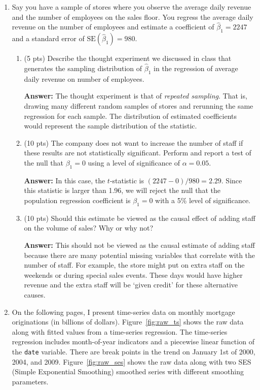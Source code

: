\documentclass[12pt]{article}
\newcommand{\answer}[1]{{\color{blue_winged_teal}\textbf{Answer:} #1}}
\newcommand{\pts}[1]{{\color{zinc500}(#1 pts)}}
\begin{document}
\begin{enumerate}
    \newpage
    \vspace*{2\bigskipamount}
  \item Say you have a sample of stores where you observe the average daily revenue and the number of employees on the sales floor.
    You regress the average daily revenue on the number of employees and estimate a coefficient of $\hat{\beta}_1 = 2247$ and a standard error of $\text{SE}(\hat{\beta}_1) = 980$.
    \begin{enumerate}
      \item \pts{5} Describe the thought experiment we discussed in class that generates the sampling distribution of $\hat{\beta}_1$ in the regression of average daily revenue on number of employees.
      
      \answer{
        The thought experiment is that of \emph{repeated sampling}.
        That is, drawing many different random samples of stores and rerunning the same regression for each sample. 
        The distribution of estimated coefficients would represent the sample distribution of the statistic.
      }

      \item \pts{10} The company does not want to increase the number of staff if these results are not statistically significant. Perform and report a test of the null that $\beta_1 = 0$ using a level of significance of $\alpha = 0.05$.
      
      \answer{
        In this case, the $t$-statistic is $(2247 - 0) / 980 = 2.29$.
        Since this statistic is larger than 1.96, we will reject the null that the population regression coefficient is $\beta_1 = 0$ with a 5\% level of significance.
      }

      \item \pts{10} Should this estimate be viewed as the causal effect of adding staff on the volume of sales? Why or why not?
      
      \answer{
        This should not be viewed as the causal estimate of adding staff because there are many potential missing variables that correlate with the number of staff. 
        For example, the store might put on extra staff on the weekends or during special sales events. 
        These days would have higher revenue and the extra staff will be `given credit' for these alternative causes.
      }
    \end{enumerate}

    \bigskip
  \item On the following pages, I present time-series data on monthly mortgage originations (in billions of dollars).
    Figure~\ref{fig:raw_ts} shows the raw data along with fitted values from a time-series regression.
    The time-series regression includes month-of-year indicators and a piecewise linear function of the \texttt{date} variable. 
    There are break points in the trend on January 1st of 2000, 2004, and 2009.
    Figure~\ref{fig:raw_ses} shows the raw data along with two SES (Simple Exponential Smoothing) smoothed series with different smoothing parameters.


\end{enumerate}
\end{document}
